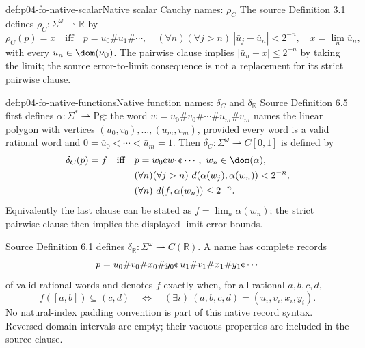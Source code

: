 \begin{hbdefinition}{def:p04-fo-native-scalar}{Native scalar Cauchy names: \(\rho_C\)}
The source Definition 3.1 defines
\(\rho_C:\Sigma^\omega\rightharpoonup\mathbb R\) by
\[
 \rho_C(p)=x
 \quad\text{iff}\quad
 p=u_0\#u_1\#\cdots,\quad
 (\forall n)(\forall j>n)\ |\bar u_j-\bar u_n|<2^{-n},
 \quad x=\lim_n\bar u_n,
\]
with every \(u_n\in\dom(\nu_{\mathbb Q})\).
The pairwise clause implies
\(|\bar u_n-x|\leq2^{-n}\) by taking the limit;
the source error-to-limit consequence is not a replacement
for its strict pairwise clause.
\end{hbdefinition}

\begin{hbdefinition}{def:p04-fo-native-functions}{Native function names: \(\delta_C\) and \(\delta_{\mathbb R}\)}
Source Definition 6.5 first defines
\(\alpha:\Sigma^*\rightharpoonup\mathrm{Pg}\):
the word \(w=u_0\#v_0\#\cdots\#u_m\#v_m\)
names the linear polygon with vertices
\((\bar u_0,\bar v_0),\ldots,(\bar u_m,\bar v_m)\),
provided every word is a valid rational word and
\(0=\bar u_0<\cdots<\bar u_m=1\).
Then \(\delta_C:\Sigma^\omega\rightharpoonup C[0,1]\)
is defined by
\[
 \begin{split}
 \delta_C(p)=f\quad\text{iff}\quad&
 p=w_0\text{\textcent}w_1\text{\textcent}\cdots,\
 w_n\in\dom(\alpha),\\
 &(\forall n)(\forall j>n)\
 d(\alpha(w_j),\alpha(w_n))<2^{-n},\\
 &(\forall n)\ d(f,\alpha(w_n))\leq2^{-n}.
 \end{split}
\]
Equivalently the last clause can be stated as
\(f=\lim_n\alpha(w_n)\); the strict pairwise clause then
implies the displayed limit-error bounds.

Source Definition 6.1 defines
\(\delta_{\mathbb R}:\Sigma^\omega\rightharpoonup C(\mathbb R)\).
A name has complete records
\[
 p=u_0\#v_0\#x_0\#y_0\text{\textcent}\,
   u_1\#v_1\#x_1\#y_1\text{\textcent}\cdots
\]
of valid rational words and denotes \(f\) exactly when,
for all rational \(a,b,c,d\),
\[
 f([a,b])\subseteq(c,d)
 \quad\Longleftrightarrow\quad
 (\exists i)\ (a,b,c,d)
 =(\bar u_i,\bar v_i,\bar x_i,\bar y_i).
\]
No natural-index padding convention is part of this native
record syntax. Reversed domain intervals are empty;
their vacuous properties are included in the source clause.
\end{hbdefinition}

